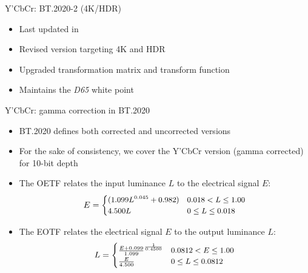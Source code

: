 \documentclass[aspectratio=169,usepdftitle=false]{fireshonks}
\begin{document}
\begin{frame}{Y'CbCr: BT.2020-2 (4K/HDR)}
    \begin{itemize}
        \item Last updated in \cite*{BT2020}
        \item Revised version targeting 4K and HDR
        \item Upgraded transformation matrix and transform function
        \item Maintains the \emph{D65} white point
    \end{itemize}

\end{frame}
\begin{frame}{Y'CbCr: gamma correction in BT.2020}
    \begin{itemize}
        \item BT.2020 defines both corrected and uncorrected versions
        \item For the sake of consistency, we cover the Y'CbCr version (gamma corrected) for 10-bit depth
        \item The OETF relates the input luminance $L$ to the electrical signal $E$: \begin{equation}
                  \small
                  E = \begin{cases}
                      (1.099L^{0.045} + 0.982) & 0.018 < L \leq 1.00 \\
                      4.500L                   & 0 \leq L \leq 0.018
                  \end{cases}
              \end{equation}
        \item The EOTF relates the electrical signal $E$ to the output luminance $L$: \begin{equation}
                  \small
                  L = \begin{cases}
                      \frac{E + 0.099}{1.099}^\frac{1}{0.4500} & 0.0812 < E \leq 1.00 \\
                      \frac{E}{4.500}                          & 0 \leq L \leq 0.0812
                  \end{cases}
              \end{equation}
    \end{itemize}
\end{frame}
\end{document}
